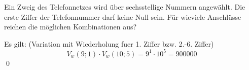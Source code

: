 \documentclass{abgabe}
\begin{document}
\begin{questions}
    \question
    Ein Zweig des Telefonnetzes wird über sechsstellige Nummern angewählt. 
    Die erste Ziffer der Telefonnummer darf keine Null sein. 
    Für wieviele Anschlüsse reichen die möglichen Kombinationen aus?
    \begin{solution}
        Es gilt: (Variation mit Wiederholung fuer 1. Ziffer bzw. 2.-6. Ziffer)
        \[ 
            V_w(9;1) \cdot V_w(10;5) = 9^1 \cdot 10^5 = \num{900000}
        \] 
        \qed
    \end{solution}
\end{questions}
\end{document}
